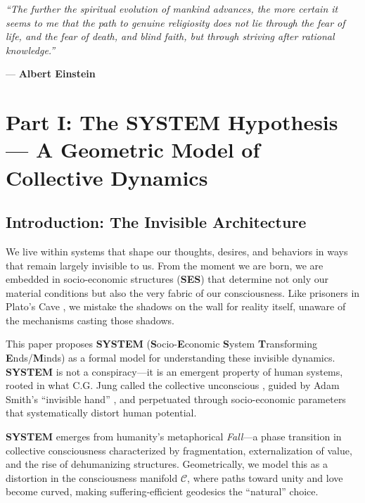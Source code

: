 \documentclass[11pt,a4paper]{article}
\newcommand{\SYSTEM}{\textbf{SYSTEM}}
\newcommand{\SES}{\textbf{SES}}
\newcommand{\CC}{$\mathcal{C}$}
\newcommand{\Fall}{\textit{Fall}}
\theoremstyle{definition}
\theoremstyle{remark}
\begin{document}
\begin{mdframed}[backgroundcolor=gray!10]
\textit{``The further the spiritual evolution of mankind advances, the more certain it seems to me that the path to genuine religiosity does not lie through the fear of life, and the fear of death, and blind faith, but through striving after rational knowledge.''}

--- \textbf{Albert Einstein} \cite{einsteinquote}
\end{mdframed}

\newpage

\section{Part I: The \SYSTEM{} Hypothesis --- A Geometric Model of Collective Dynamics}

\subsection{Introduction: The Invisible Architecture}

We live within systems that shape our thoughts, desires, and behaviors in ways that remain largely invisible to us. From the moment we are born, we are embedded in socio-economic structures (\SES{}) that determine not only our material conditions but also the very fabric of our consciousness. Like prisoners in Plato's Cave \cite{plato_republic}, we mistake the shadows on the wall for reality itself, unaware of the mechanisms casting those shadows.

This paper proposes \SYSTEM{} (\textbf{S}ocio-\textbf{E}conomic \textbf{S}ystem \textbf{T}ransforming \textbf{E}nds/\textbf{M}inds) as a formal model for understanding these invisible dynamics. \SYSTEM{} is not a conspiracy---it is an emergent property of human systems, rooted in what C.G. Jung called the collective unconscious \cite{jung1969collective}, guided by Adam Smith's ``invisible hand'' \cite{smith1776wealth}, and perpetuated through socio-economic parameters that systematically distort human potential.

\SYSTEM{} emerges from humanity's metaphorical \Fall{}---a phase transition in collective consciousness characterized by fragmentation, externalization of value, and the rise of dehumanizing structures. Geometrically, we model this as a distortion in the consciousness manifold \CC{}, where paths toward unity and love become curved, making suffering-efficient geodesics the ``natural'' choice.
\end{document}
